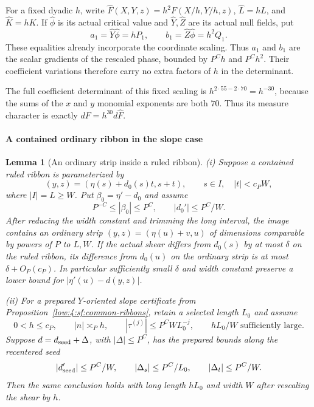 \documentclass[11pt]{amsart}
\newtheorem{lemma}[theorem]{Lemma}
\theoremstyle{definition}
\theoremstyle{remark}
\numberwithin{equation}{section}
\begin{document}
For a fixed dyadic $h$, write $\widehat F(X,Y,z)=h^2F(X/h,Y/h,z)$, $\widehat L=hL$, and $\widehat K=hK$. If $\widehat\phi$ is its actual critical value and $\widehat Y,\widehat Z$ are its actual null fields, put
\[
a_1=\widehat Y\widehat\phi=hP_1,\qquad b_1=\widehat Z\widehat\phi=h^2Q_1.
\]
These equalities already incorporate the coordinate scaling. Thus $a_1$ and $b_1$ are the scalar gradients of the rescaled phase, bounded by $P^Ch$ and $P^Ch^2$. Their coefficient variations therefore carry no extra factors of $h$ in the determinant.

The full coefficient determinant of this fixed scaling is $h^{2\cdot55-2\cdot70}=h^{-30}$, because the sums of the $x$ and $y$ monomial exponents are both $70$. Thus its measure character is exactly $dF=h^{30}d\widehat F$.

\paragraph{A contained ordinary ribbon in the slope case}
\begin{lemma}[An ordinary strip inside a ruled ribbon]\label{low:surface:ordinary-strip}
\textup{(i)} Suppose a contained ruled ribbon is parameterized by
\[
(y,z)=(\eta(s)+d_0(s)t,s+t),\qquad s\in I,\quad |t|<c_PW,
\]
where $|I|=L\ge W$. Put $\beta_0=\eta'-d_0$ and assume
\[
P^{-C}\le|\beta_0|\le P^C,\qquad |d_0'|\le P^C/W.
\]
After reducing the width constant and trimming the long interval, the image contains an ordinary strip $(y,z)=(\eta(u)+v,u)$ of dimensions comparable by powers of $P$ to $L,W$. If the actual shear differs from $d_0(s)$ by at most $\delta$ on the ruled ribbon, its difference from $d_0(u)$ on the ordinary strip is at most $\delta+O_P(c_P)$. In particular sufficiently small $\delta$ and width constant preserve a lower bound for $|\eta'(u)-d(y,z)|$.

\textup{(ii)} For a prepared $Y$-oriented slope certificate from Proposition~\ref{low:4:sf:common-ribbons}, retain a selected length $L_0$ and assume
\[
0<h\le c_P,\qquad |n|\asymp_Ph,\qquad |\tau^{(j)}|\le P^CW L_0^{-j},\qquad hL_0/W\text{ sufficiently large}.
\]
Suppose $d=d_{\rm seed}+\Delta$, with $|\Delta|\le P^C$, has the prepared bounds along the recentered seed
\[
|d_{\rm seed}'|\le P^C/W,\qquad |\Delta_s|\le P^C/L_0,\qquad |\Delta_t|\le P^C/W.
\]
Then the same conclusion holds with long length $hL_0$ and width $W$ after rescaling the shear by $h$.
\end{lemma}
\end{document}
